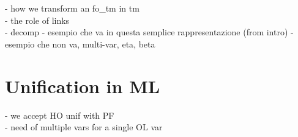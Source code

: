 \documentclass[sigconf,natbib=false]{acmart}
\begin{document}
\noindent
- how we transform an fo\_tm in tm \\
- the role of links \\
- decomp
- esempio che va in questa semplice rappresentazione (from intro)
- esempio che non va, multi-var, eta, beta

\section{Unification in ML}

- we accept HO unif with PF \\
- need of multiple vars for a single OL var















\end{document}
